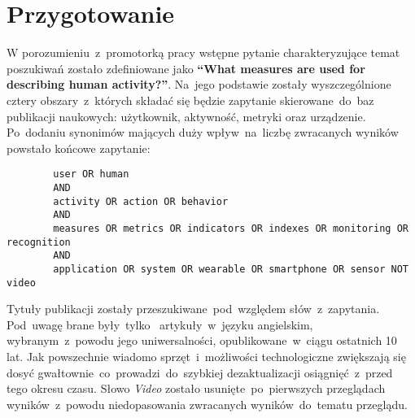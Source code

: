 \section{Przygotowanie}
W porozumieniu~z~promotorką pracy wstępne pytanie charakteryzujące temat poszukiwań zostało zdefiniowane jako \textbf{``What measures are used for describing human activity?''}. Na~jego podstawie zostały wyszczególnione cztery obszary~z~których składać się będzie zapytanie skierowane~do~baz publikacji naukowych: użytkownik, aktywność, metryki oraz urządzenie. Po~dodaniu synonimów mających duży wpływ~na~liczbę zwracanych wyników powstało końcowe zapytanie:
\begin{center}
	\begin{minipage}{0.9\linewidth}
		\begin{verbatim}
		user OR human
		AND
		activity OR action OR behavior
		AND
		measures OR metrics OR indicators OR indexes OR monitoring OR recognition
		AND
		application OR system OR wearable OR smartphone OR sensor NOT video
		\end{verbatim}
	\end{minipage}
\end{center}

Tytuły publikacji zostały przeszukiwane~pod~względem słów~z~zapytania. Pod~uwagę brane były~tylko~ artykuły~w~języku angielskim, wybranym~z~powodu jego uniwersalności, opublikowane~w~ciągu ostatnich 10 lat. Jak powszechnie wiadomo sprzęt~i~możliwości technologiczne zwiększają się dosyć gwałtownie~co~prowadzi~do~szybkiej dezaktualizacji osiągnięć~z~przed tego okresu czasu. Słowo \textit{Video} zostało usunięte~po~pierwszych przeglądach wyników~z~powodu niedopasowania zwracanych wyników~do~tematu przeglądu.
